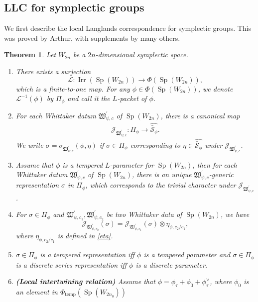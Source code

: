 \documentclass[article]{article}
\numberwithin{equation}{section}
\newtheorem{theorem}{Theorem}[section]
\theoremstyle{definition}
\DeclareMathOperator{\SP}{Sp}
\DeclareMathOperator{\Irr}{Irr}
\begin{document}
\subsection{LLC for symplectic groups}
We first describe the local Langlands correspondence for symplectic groups. This was proved by Arthur\cite{MR3135650}, with supplements by many others. 
 
\begin{theorem}\label{llcsympletic}
Let $W_{2n}$ be a $2n$-dimensional symplectic space.  
	\begin{enumerate}[(1).]
		\item There exists a surjection
		$$
		\mathcal L:  \Irr \left(\SP(W_{2n})\right) \longrightarrow \Phi(\SP(W_{2n})),$$
		which is a finite-to-one map. For any $\phi \in \Phi(\SP(W_{2n}))$, we denote $\mathcal L^{-1}(\phi)$ by $\Pi_{\phi}$ and call it the $L$-packet of $\phi$. 
		\item For each Whittaker datum $\mathfrak W^\prime_{\psi,c}$ of $\SP(W_{2n})$, there is a canonical map
		\begin{align}
		\mathcal J_{\mathfrak W^\prime_{\psi,c}} : \Pi_{\phi} \longrightarrow \widehat{\bar {\mathcal {S}}_{\phi}}. 
		\end{align}
		We write $\sigma=\sigma_{\mathfrak W^\prime_{\psi,c}}(\phi,\eta)$ if $\sigma \in \Pi_{\phi}$ corresponding to $\eta \in \widehat{\bar {\mathcal S}_{\phi}}$ under $\mathcal J_{\mathfrak W^\prime_{\psi,c}}$. 
		\item Assume that $\phi$ is a tempered $L$-parameter for $\SP(W_{2n})$, then for each Whittaker datum $\mathfrak W^\prime_{\psi,c}$ of $\SP(W_{2n})$, there is an unique $\mathfrak W^\prime_{\psi,c}$-generic representation $\sigma$ in $\Pi_{\phi}$, which corresponds to the trivial character under $\mathcal J_{\mathfrak W^\prime_{\psi,c}}$. 
		\item 
		For $\sigma\in \Pi_{\phi}$ and $\mathfrak W^\prime_{\psi,c_1},\mathfrak W^\prime_{\psi,c_2}$ be two Whittaker data of $\SP(W_{2n})$, we have 
		$$
		\mathcal J_{\mathfrak W^\prime_{\psi,c_2}}(\sigma)=\mathcal J_{\mathfrak W^\prime_{\psi,c_1}}(\sigma)\otimes \eta_{\phi,c_2/c_1},
		$$
		where $\eta_{\phi,c_2/c_1}$ is defined in \ref{eta}. 
		\item
		$\sigma\in \Pi_{\phi}$ is a tempered representation iff $\phi$ is a tempered parameter and $\sigma\in \Pi_{\phi}$ is a discrete series representation iff $\phi$ is a discrete parameter.
		\item
		\textbf{(Local intertwining relation)}
		Assume that $\phi=\phi_{\tau}+\phi_{0}+\phi_{\tau}^{\vee}$, where $\phi_{0}$ is an element in $\Phi_{\mathrm {temp}}\left(\SP(W_{2n_0})\right)$

\end{enumerate}
\end{theorem}
\end{document}
